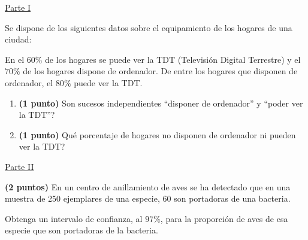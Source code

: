 
\noindent\underline{Parte I}

Se dispone de los siguientes datos sobre el equipamiento de los hogares de una ciudad:

En el $60\%$ de los hogares se puede ver la TDT (Televisión Digital Terrestre) y el $70\%$ de los hogares dispone de ordenador. De entre los hogares que disponen de ordenador, el $80\%$ puede ver la TDT.
\begin{enumerate}[label=\alph*)]
\item \textbf{(1 punto)} \textquestiondown{}Son sucesos independientes ``disponer de ordenador'' y ``poder ver la TDT''?
\item \textbf{(1 punto)} \textquestiondown{}Qué porcentaje de hogares no disponen de ordenador ni pueden ver la TDT?
\end{enumerate}
\par\noindent\begin{minipage}{\linewidth}
\noindent\underline{Parte II}

\textbf{(2 puntos)} En un centro de anillamiento de aves se ha detectado que en una muestra de 250 ejemplares de una especie, 60 son portadoras de una bacteria.

Obtenga un intervalo de confianza, al $97\%$, para la proporción de aves de esa especie que son portadoras de la bacteria.
\end{minipage}\par
